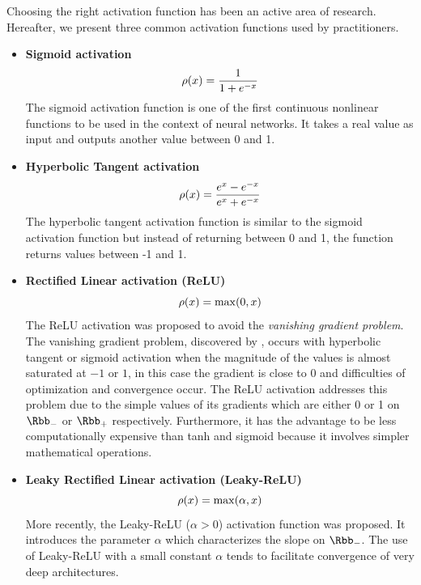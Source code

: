 Choosing the right activation function has been an active area of research. 
Hereafter, we present three common activation functions used by practitioners.
\begin{itemize}
  \item \textbf{Sigmoid activation} \cite{han1995influence}
    \begin{equation*}
      \rho(x) = \frac{1}{1+e^{-x}} 
    \end{equation*}
    The sigmoid activation function is one of the first continuous nonlinear functions to be used in the context of neural networks.
		It takes a real value as input and outputs another value between 0 and 1.
  \item \textbf{Hyperbolic Tangent activation} \cite{karlik2011performance}
    \begin{equation*}
      \rho(x) = \frac{e^x - e^{-x}}{e^x + e^{-x}}
    \end{equation*}
    The hyperbolic tangent activation function is similar to the sigmoid activation function but instead of returning between 0 and 1, the function returns values between -1 and 1.     
  \item \textbf{Rectified Linear activation (ReLU)} \cite{nair2010rectified,maas2013rectifier}
    \begin{equation*}
      \rho(x) = \max(0, x)
    \end{equation*}
    The ReLU activation was proposed to avoid the \emph{vanishing gradient problem}.
    The vanishing gradient problem, discovered by \citet{bengio1994learning}, occurs with hyperbolic tangent or sigmoid activation when the magnitude of the values is almost saturated at $-1$ or $1$, in this case the gradient is close to $0$ and difficulties of optimization and convergence occur.
    The ReLU activation addresses this problem due to the simple values of its gradients which are either 0 or 1 on $\Rbb_-$ or $\Rbb_+$ respectively.
    Furthermore, it has the advantage to be less computationally expensive than tanh and sigmoid because it involves simpler mathematical operations.
  \item \textbf{Leaky Rectified Linear activation (Leaky-ReLU)} \cite{maas2013rectifier}
    \begin{equation*}
      \rho(x) = \max(\alpha, x)
    \end{equation*}
    More recently, the Leaky-ReLU ($\alpha > 0$) activation function was proposed.
    It introduces the parameter $\alpha$ which characterizes the slope on $\Rbb_-$.
    The use of Leaky-ReLU with a small constant $\alpha$ tends to facilitate convergence of very deep architectures.
\end{itemize}

